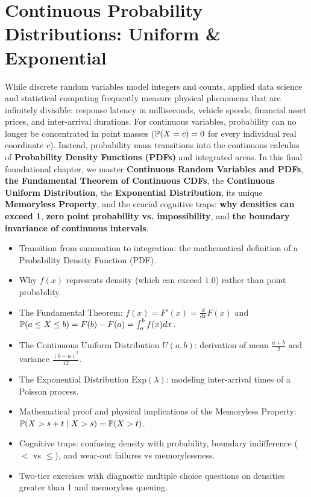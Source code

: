 \chapter{Continuous Probability Distributions: Uniform \& Exponential}

While discrete random variables model integers and counts, applied data science and statistical computing frequently measure physical phenomena that are infinitely divisible: response latency in milliseconds, vehicle speeds, financial asset prices, and inter-arrival durations. For continuous variables, probability can no longer be concentrated in point masses ($\P(X = c) = 0$ for every individual real coordinate $c$). Instead, probability mass transitions into the continuous calculus of \textbf{Probability Density Functions (PDFs)} and integrated areas. In this final foundational chapter, we master \textbf{Continuous Random Variables and PDFs}, \textbf{the Fundamental Theorem of Continuous CDFs}, the \textbf{Continuous Uniform Distribution}, the \textbf{Exponential Distribution}, its unique \textbf{Memoryless Property}, and the crucial cognitive traps: \textbf{why densities can exceed 1}, \textbf{zero point probability vs. impossibility}, and \textbf{the boundary invariance of continuous intervals}.

\vspace{0.5cm}
\begin{tcolorbox}[colback=primarylight, colframe=primarydark, title={\textbf{What You'll Learn in this Chapter}}]
\begin{itemize}
    \item Transition from summation to integration: the mathematical definition of a Probability Density Function (PDF).
    \item Why $f(x)$ represents density (which can exceed $1.0$) rather than point probability.
    \item The Fundamental Theorem: $f(x) = F'(x) = \frac{d}{dx}F(x)$ and $\P(a \le X \le b) = F(b) - F(a) = \int_a^b f(x) dx$.
    \item The Continuous Uniform Distribution $U(a, b)$: derivation of mean $\frac{a+b}{2}$ and variance $\frac{(b-a)^2}{12}$.
    \item The Exponential Distribution $\text{Exp}(\lambda)$: modeling inter-arrival times of a Poisson process.
    \item Mathematical proof and physical implications of the Memoryless Property: $\P(X > s + t \mid X > s) = \P(X > t)$.
    \item Cognitive traps: confusing density with probability, boundary indifference ($<$ vs $\le$), and wear-out failures vs memorylessness.
    \item Two-tier exercises with diagnostic multiple choice questions on densities greater than 1 and memoryless queuing.
\end{itemize}
\end{tcolorbox}

